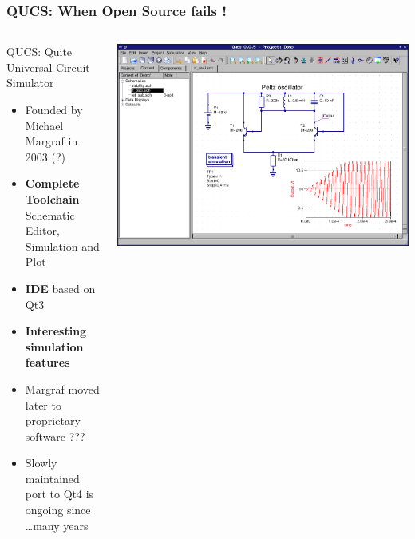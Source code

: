 \begin{frame}
  \frametitle{QUCS: When Open Source fails !}
  \begin{columns}
    \begin{column}{.6\textwidth}
      \centerline{QUCS: Quite Universal Circuit Simulator}
      \begin{itemize}
      \item Founded by Michael Margraf in 2003 {\tiny (?)}
      \item \textbf{Complete Toolchain} \\
        Schematic Editor, Simulation and Plot
      \item \textbf{IDE} based on Qt3 \\
      \item \textbf{Interesting simulation features}
      \item Margraf moved later to proprietary software ???
      \item Slowly maintained \\
        port to Qt4 is ongoing since \ldots many years
      \end{itemize}
    \end{column}
    \begin{column}{.4\textwidth}
      \begin{center}
        \includegraphics[width=1.\textwidth]{images/qucs.png}
      \end{center}
    \end{column}
  \end{columns}
\end{frame}

